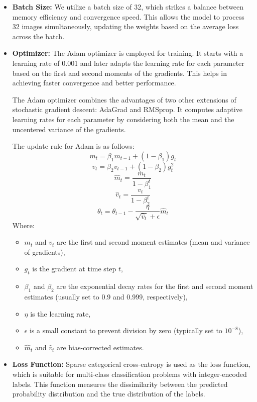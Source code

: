 \documentclass{article}
\begin{document}
\begin{itemize}
    \item \textbf{Batch Size:} We utilize a batch size of 32, which strikes a balance between memory efficiency and convergence speed. This allows the model to process 32 images simultaneously, updating the weights based on the average loss across the batch.
    \item \textbf{Optimizer:} The Adam optimizer is employed for training. It starts with a learning rate of 0.001 and later adapts the learning rate for each parameter based on the first and second moments of the gradients. This helps in achieving faster convergence and better performance.

The Adam optimizer combines the advantages of two other extensions of stochastic gradient descent: AdaGrad and RMSprop. It computes adaptive learning rates for each parameter by considering both the mean and the uncentered variance of the gradients.

The update rule for Adam is as follows:
\[
m_t = \beta_1 m_{t-1} + (1 - \beta_1) g_t
\]
\[
v_t = \beta_2 v_{t-1} + (1 - \beta_2) g_t^2
\]
\[
\hat{m}_t = \frac{m_t}{1 - \beta_1^t}
\]
\[
\hat{v}_t = \frac{v_t}{1 - \beta_2^t}
\]
\[
\theta_t = \theta_{t-1} - \frac{\eta}{\sqrt{\hat{v}_t} + \epsilon} \hat{m}_t
\]
Where:
\begin{itemize}
    \item \( m_t \) and \( v_t \) are the first and second moment estimates (mean and variance of gradients),
    \item \( g_t \) is the gradient at time step \( t \),
    \item \( \beta_1 \) and \( \beta_2 \) are the exponential decay rates for the first and second moment estimates (usually set to 0.9 and 0.999, respectively),
    \item \( \eta \) is the learning rate,
    \item \( \epsilon \) is a small constant to prevent division by zero (typically set to \( 10^{-8} \)),
    \item \( \hat{m}_t \) and \( \hat{v}_t \) are bias-corrected estimates.
\end{itemize}
\item \textbf{Loss Function:} Sparse categorical cross-entropy is used as the loss function, which is suitable for multi-class classification problems with integer-encoded labels. This function measures the dissimilarity between the predicted probability distribution and the true distribution of the labels.


\end{itemize}
\end{document}
